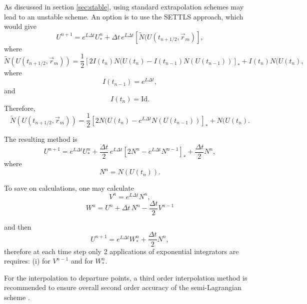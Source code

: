 \documentclass[10pt,a4paper]{article}
\begin{document}
As discussed in section \ref{sec:stable}, using standard extrapolation schemes may lead to an unstable scheme. An option is to use the SETTLS approach, which would give
\begin{equation}
U^{n+1}=e^{L \Delta t}  U^{n}_{*}+\Delta t \, e^{L\Delta t}\left[  \tilde{N}(U(t_{n+1/2}, \vec{r}_m)\right],
\end{equation}
where 
\begin{equation}
 \tilde{N}(U(t_{n+1/2}, \vec{r}_m)) = 
\frac{1}{2}\left[2 I(t_{n}) N(U(t_{n})- I(t_{n-1}) N(U(t_{n-1})) \right]_*+ I(t_{n}) N(U(t_{n}),
\end{equation}
where
\begin{equation}
 I(t_{n-1})=e^{L\Delta t},
\end{equation} 
 and
\begin{equation}
 I(t_{n})=\text{Id}.
\end{equation} 
Therefore,
\begin{equation}
 \tilde{N}(U(t_{n+1/2}, \vec{r}_m)) = 
\frac{1}{2}\left[2 N(U(t_{n})- e^{L\Delta t} N(U(t_{n-1})) \right]_*+  N(U(t_{n}).
\end{equation}

The resulting method is 
\begin{equation}
U^{n+1}=e^{L \Delta t} U_*^n+\frac{\Delta t}{2}\,e^{L\Delta t}\left[ 2 N^n- e^{L\Delta t}N^{n-1}\right]_*+\frac{\Delta t}{2}N^n,
\end{equation}
where
\begin{equation}
N^n=N(U(t_n)).
\end{equation}

To save on calculations, one may calculate
\begin{equation}
V^n= e^{L\Delta t}N^n, 
\end{equation}
\begin{equation}
W^n= U^n+ \Delta t \,N^n- \frac{\Delta t}{2} V^{n-1}
\end{equation}


and then
\begin{equation}
U^{n+1}=e^{L \Delta t} W^n_* + \frac{\Delta t}{2}N^n,
\end{equation}
therefore at each time step only 2 applications of exponential integrators are requires: (i) for $V^{n-1}$ and for $W^n_*$.


For the interpolation to departure points, a third order interpolation method is recommended to ensure overall second order accuracy of the semi-Lagrangian scheme \cite{Peixoto2014}.
%
%
\end{document}
